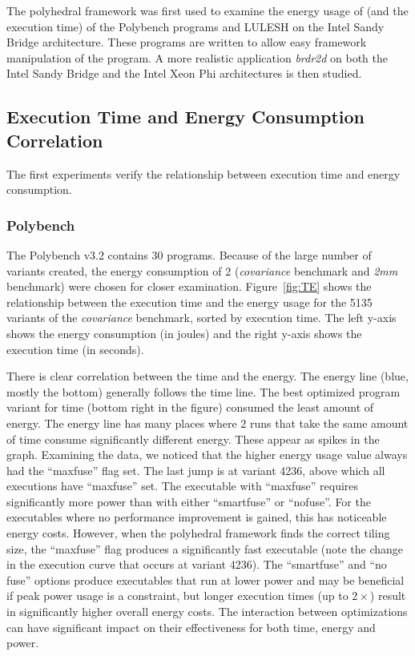 The polyhedral framework was first used to examine the energy usage of
(and the execution time) of the Polybench programs and LULESH on the Intel Sandy Bridge
architecture. These programs are
written to allow easy framework manipulation of the program. 
A more realistic application \emph{brdr2d} on both the Intel Sandy Bridge
and the Intel Xeon Phi architectures is then studied.

\subsection{Execution Time and Energy Consumption Correlation}
The first experiments verify the relationship between execution time and energy consumption.

\subsubsection{Polybench}
The Polybench v3.2 contains 30 programs. Because of the large number of variants
created, the energy consumption of 2 (\emph{covariance} benchmark and \emph{2mm} benchmark)
were chosen for closer examination.
Figure~\ref{fig:TE} shows the relationship between the execution time and the 
energy usage for the 5135 variants of the \emph{covariance} benchmark, sorted by execution time.
The left y-axis shows the energy consumption (in joules) and the right y-axis shows the 
execution time (in seconds).

There is clear correlation between the time and the energy. The
energy line (blue, mostly the bottom) generally follows the time line.  
The best optimized program variant for time (bottom right in the figure)  
consumed the least amount of energy. The energy line has many places 
where 2 runs that take the same amount of time consume significantly different
energy. These appear as spikes in the graph. Examining the data,
we noticed that the higher energy usage value always had the ``maxfuse'' flag set.
The last jump is at variant 4236, above which all executions have ``maxfuse'' set.
The executable with ``maxfuse'' requires significantly more power than 
with either ``smartfuse'' or ``nofuse''.  For the executables where
no performance improvement is gained, this has noticeable energy costs.  However,
when the polyhedral framework finds the correct tiling size, the ``maxfuse''
flag produces a significantly fast executable (note the change in the
execution curve that occurs at variant 4236).
The ``smartfuse'' and ``no fuse'' options produce executables that run at lower power and may be beneficial if
peak power usage is a constraint, but longer execution times (up to $2\times$) result
in significantly higher overall energy costs.
The interaction between optimizations can have significant impact on
their effectiveness for both time, energy and power.

